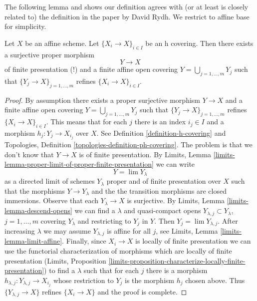 \noindent
The following lemma and \cite[Theorem 8.4]{rydh_descent}
shows our definition agrees with (or at least is
closely related to) the definition in the paper \cite{rydh_descent}
by David Rydh. We restrict to affine base for simplicity.

\begin{lemma}
\label{lemma-approximate-h-cover}
Let $X$ be an affine scheme. Let $\{X_i \to X\}_{i \in I}$
be an h covering. Then there exists a surjective proper morphism
$$
Y \longrightarrow X
$$
of finite presentation (!) and a finite affine open covering
$Y = \bigcup_{j = 1, \ldots, m} Y_j$ such that
$\{Y_j \to X\}_{j = 1, \ldots, m}$ refines $\{X_i \to X\}_{i \in I}$.
\end{lemma}

\begin{proof}
By assumption there exists a proper surjective morphism
$Y \to X$ and a finite affine open covering
$Y = \bigcup_{j = 1, \ldots, m} Y_j$ such that
$\{Y_j \to X\}_{j = 1, \ldots, m}$ refines $\{X_i \to X\}_{i \in I}$.
This means that for each $j$ there is an index $i_j \in I$
and a morphism $h_j : Y_j \to X_{i_j}$ over $X$.
See Definition \ref{definition-h-covering} and
Topologies, Definition \ref{topologies-definition-ph-covering}.
The problem is that we don't know that $Y \to X$ is of finite
presentation.
By
Limits, Lemma \ref{limits-lemma-proper-limit-of-proper-finite-presentation}
we can write
$$
Y = \lim Y_\lambda
$$
as a directed limit of schemes $Y_\lambda$ proper and of finite presentation
over $X$ such that the morphisms $Y \to Y_\lambda$ and the
the transition morphisms are closed immersions. Observe that
each $Y_\lambda \to X$ is surjective.
By Limits, Lemma \ref{limits-lemma-descend-opens}
we can find a $\lambda$ and quasi-compact opens
$Y_{\lambda, j} \subset Y_\lambda$, $j = 1, \ldots, m$
covering $Y_\lambda$ and restricting to $Y_j$ in $Y$.
Then $Y_j = \lim Y_{\lambda, j}$.
After increasing $\lambda$ we may assume $Y_{\lambda, j}$
is affine for all $j$, see
Limits, Lemma \ref{limits-lemma-limit-affine}.
Finally, since $X_i \to X$ is locally of finite presentation
we can use the functorial characterization of morphisms
which are locally of finite presentation
(Limits, Proposition
\ref{limits-proposition-characterize-locally-finite-presentation})
to find a $\lambda$ such that for each $j$ there is
a morphism $h_{\lambda, j} : Y_{\lambda, j} \to X_{i_j}$
whose restriction to $Y_j$ is the morphism $h_j$ chosen above.
Thus $\{Y_{\lambda, j} \to X\}$ refines
$\{X_i \to X\}$ and the proof is complete.
\end{proof}

